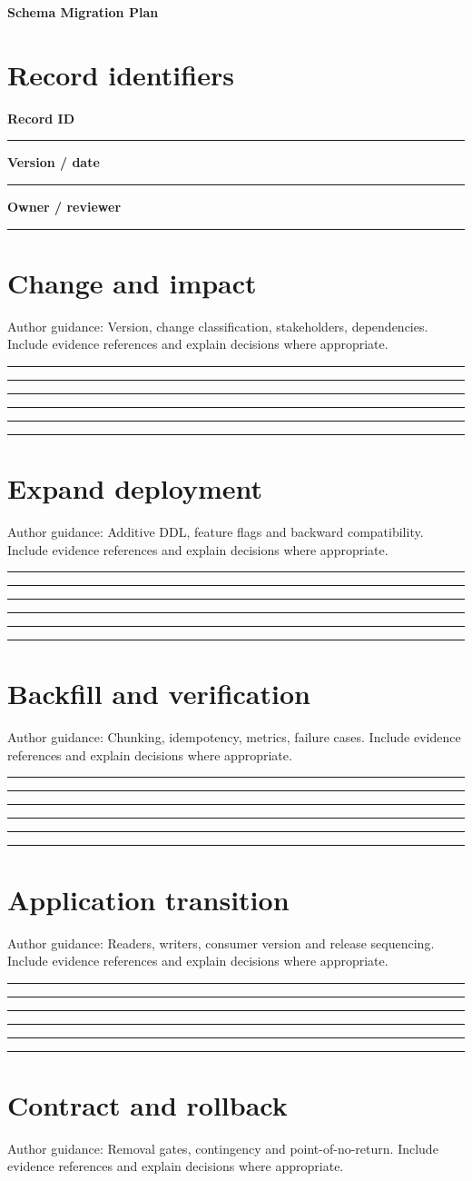 \documentclass[11pt,letterpaper]{article}
\newcommand{\ResponseLine}{\par\vspace{1.05em}\noindent\rule{\linewidth}{0.4pt}\par}
\newcommand{\ResponseArea}{\ResponseLine\ResponseLine\ResponseLine}
\begin{document}
\begin{center}
{\LARGE\bfseries\color{navy} Schema Migration Plan}\par
\vspace{0.25em}{\large Authoring Template | guided fields}\par
{}
\end{center}
\vspace{0.8em}
\section{Record identifiers}
\textbf{Record ID}\ResponseLine\textbf{Version / date}\ResponseLine\textbf{Owner / reviewer}\ResponseLine
\section{Change and impact}
Author guidance: Version, change classification, stakeholders, dependencies. Include evidence references and explain decisions where appropriate.


\ResponseArea\ResponseArea
\section{Expand deployment}
Author guidance: Additive DDL, feature flags and backward compatibility. Include evidence references and explain decisions where appropriate.


\ResponseArea\ResponseArea
\section{Backfill and verification}
Author guidance: Chunking, idempotency, metrics, failure cases. Include evidence references and explain decisions where appropriate.


\ResponseArea\ResponseArea
\section{Application transition}
Author guidance: Readers, writers, consumer version and release sequencing. Include evidence references and explain decisions where appropriate.


\ResponseArea\ResponseArea
\section{Contract and rollback}
Author guidance: Removal gates, contingency and point-of-no-return. Include evidence references and explain decisions where appropriate.
\end{document}
